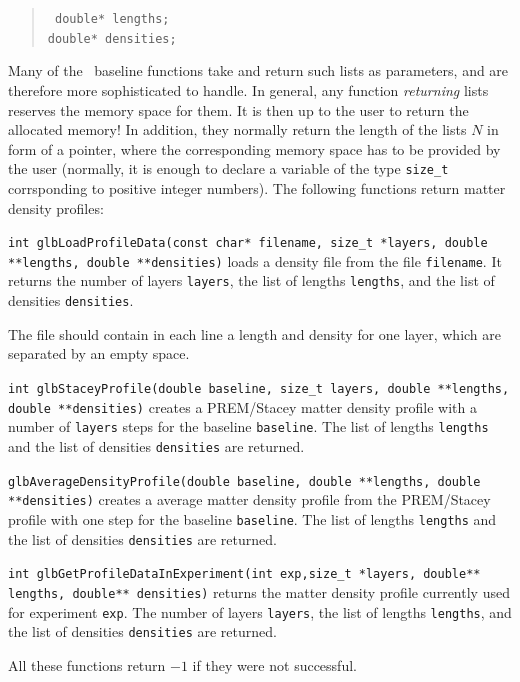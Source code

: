 \begin{quote}
{\tt  
  double* lengths; \\
  double* densities;
}
\end{quote}
Many of the \GLOBES\ baseline functions take and return
such lists as parameters, and are therefore more sophisticated
to handle. In general, any function
{\em returning} lists reserves the memory space for them.
It is then up to the user to return the allocated memory!
In addition, they normally return the length of the lists $N$
in form of a pointer, where the corresponding memory space 
has to be provided by the user (normally, it is enough to declare
a variable of the type {\tt size\_t} corrsponding to positive
integer numbers).
The following functions return matter density profiles:
\begin{function}
{\tt int glbLoadProfileData(const char* filename, size\_t *layers, double **lengths, double **densities)} loads a density file from the file
{\tt filename}. It returns the number of layers {\tt layers}, the
list of lengths {\tt lengths}, and the list of densities {\tt densities}.
\end{function}
The file should contain in each line a length and density for one layer,
which are separated by an empty space.
\begin{function}
{\tt int glbStaceyProfile(double baseline, size\_t layers, double **lengths, double **densities)} creates a PREM/Stacey matter density profile with a
number of {\tt layers} steps for the baseline {\tt baseline}. The list of lengths {\tt lengths} and the list of densities {\tt densities} are returned.
\end{function}
\begin{function}
{\tt glbAverageDensityProfile(double baseline, double **lengths, 
double **densities)} creates a average matter density profile from the PREM/Stacey profile with one step for the baseline {\tt baseline}. The list of lengths {\tt lengths} and the list of densities {\tt densities} are returned.
\end{function}
\begin{function}
{\tt int glbGetProfileDataInExperiment(int exp,size\_t *layers, double** lengths, double** densities)} returns the matter density profile 
currently used for experiment {\tt exp}. The number of layers {\tt layers}, the list of lengths {\tt lengths}, and the list of densities {\tt densities} are returned.
\end{function}
All these functions return $-1$ if they were not successful.

